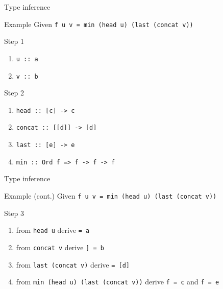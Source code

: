 \documentclass{beamer}
\def\code#1{\texttt{\frenchspacing#1}}
\begin{document}
\begin{frame}{Type inference}

\begin{exampleblock}{Example}
Given \code{f u v = min (head u) (last (concat v))}

\pause

\vspace{0.25cm}
Step 1\pause
\begin{enumerate}
    \item \code{u :: a}
    \item \code{v :: b}
\end{enumerate}
Step 2\pause
\begin{enumerate}
    \item \code{head :: [c] -> c}\pause
    \item \code{concat :: [[d]] -> [d]}\pause
    \item \code{last :: [e] -> e}\pause
    \item \code{min :: Ord f => f -> f -> f}
\end{enumerate}
\end{exampleblock}

\end{frame}

\begin{frame}{Type inference}

\begin{exampleblock}{Example (cont.)}
Given \code{f u v = min (head u) (last (concat v))}

\vspace{0.25cm}
Step 3\pause
\begin{enumerate}
    \item from \code{head u} derive \code{[c] = a}\pause
    \item from \code{concat v} derive \code{[[d]] = b}\pause
    \item from \code{last (concat v)} derive \code{[e] = [d]}\pause
    \item from \code{min (head u) (last (concat v))} derive \code{f = c} and \code{f = e}
\end{enumerate}
\end{exampleblock}

\end{frame}
\end{document}
